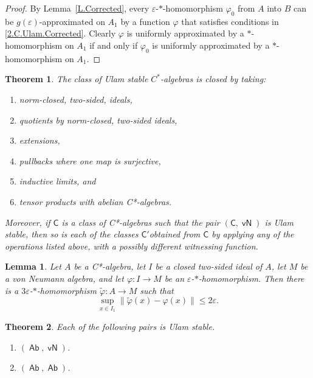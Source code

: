\documentclass[10pt,a4paper]{amsart}
\newtheorem{lemma}{Lemma}
\newtheorem{theorem}{Theorem}
\newcommand{\cstar}{C*}
\newcommand{\sfC}{\mathsf C}
\DeclareMathOperator{\sfCOM}{\mathsf {Ab}}
\DeclareMathOperator{\sfvN}{\mathsf {vN}}
\begin{document}
\begin{proof}
	By Lemma~\ref{L.Corrected}, every $\varepsilon$-$*$-homomorphism $\varphi_0$ from $A$ into $B$ can be $g(\varepsilon)$-approximated on $A_1$ by a function $\varphi$ that satisfies  conditions in \eqref{2.C.Ulam.Corrected}. Clearly $\varphi$ is uniformly approximated by a $*$-homomorphism on $A_1$ if and only if $\varphi_0$ is uniformly approximated by a $*$-homomorphism on $A_1$. 
\end{proof}

\begin{theorem}
\label{T.Closure}
The class of Ulam stable $C^*$-algebras is closed by taking:
\begin{enumerate}
\item \label{I.Ideals} norm-closed,  two-sided,  ideals,
\item \label{I.Quotients} quotients by norm-closed,  two-sided ideals,
\item \label{I.Extensions} extensions,
\item \label{I.Pullback} pullbacks where one map is surjective,
\item \label{thm:Johnson} inductive limits, and
\item \label{I.Tensor}tensor products with abelian \cstar-algebras.
\end{enumerate}
Moreover, if $\sfC$ is a class of \cstar-algebras such that the pair $(\sfC,\sfvN)$ is Ulam stable, then so is each of the classes $\sfC'$obtained from $\sfC$ by applying any of the operations listed above, with a possibly different witnessing function.
\end{theorem}

\begin{lemma}\label{L.extend.from.ideal}
Let $A$ be a \cstar-algebra, let $I$ be a closed two-sided ideal of $A$,
let $M$ be a von Neumann algebra, and let
$
\varphi\colon I\to M
$ 
be an $\varepsilon$-$*$-homomorphism.
Then there is a $3\varepsilon$-$*$-homomorphism
$
\widetilde\varphi\colon A\to M
$
such that
\[
\sup_{x\in I_1}\|\widetilde\varphi(x)-\varphi(x)\|
\leq 2\varepsilon.
\]
\end{lemma}

\begin{theorem} \label{T.Abelian+} Each of the following pairs is Ulam stable. 
	\begin{enumerate}
		\item \label{U.Abelian.vN} $(\sfCOM,\sfvN)$. 
		\item \label{U.Abelian.Abelian}
		$(\sfCOM,\sfCOM)$. 
	\end{enumerate}
\end{theorem}
\end{document}
